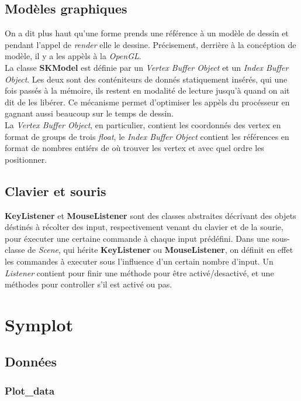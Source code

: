 \documentclass{report}
\begin{document}
\section {Modèles graphiques}

On a dit plus haut qu'une forme prends une référence à un modèle de dessin et 
pendant l'appel de \textit{render} elle le dessine. Précisement, 
derrière à la concéption de modèle, il y a les appèls à la \textit{OpenGL}.
\\
La classe \textbf{SKModel} est définie par un \textit{Vertex Buffer Object} et 
un \textit{Index Buffer Object}. Les deux sont des conténiteurs de donnés statiquement 
insérés, qui une fois passés à la mémoire, ils restent en modalité de lecture 
jusqu'à quand on ait dit de les libérer. Ce mécanisme permet d'optimiser les appèls du 
procésseur en gagnant aussi beaucoup sur le temps de dessin.
\\
La \textit{Vertex Buffer Object}, en particulier, contient les coordonnés des
vertex en format de groups de trois \textit{float}, le \textit{Index Buffer
Object} contient les références en format de nombres entiérs de où trouver les 
vertex et avec quel ordre les positionner.

\section {Clavier et souris}

\textbf{KeyListener} et \textbf{MouseListener} sont des classes abstraites décrivant des objets déstinés à récolter des input, respectivement venant du clavier et de la sourie,
pour éxecuter une certaine commande à chaque input prédéfini.
Dans une sous-classe de \textit{Scene}, qui hérite \textbf{KeyListener} ou \textbf{MouseListener}, on définit en effet les commandes à executer sous l'influence d'un certain nombre d'input.
Un \textit{Listener} contient pour finir une méthode pour être activé/desactivé, et une méthodes pour controller s'il est activé ou pas.


\chapter{Symplot}

\section{Données}

\subsection{Plot\_data}
\end{document}
